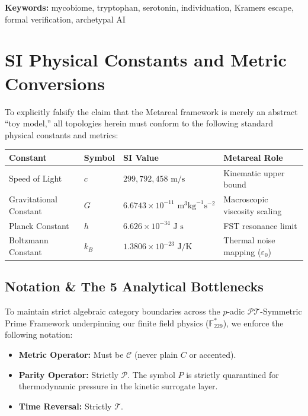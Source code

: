 \medskip\noindent
\textbf{Keywords:} mycobiome, tryptophan, serotonin, individuation,
Kramers escape, formal verification, archetypal AI
\vspace{1em}

\section*{SI Physical Constants and Metric Conversions}
To explicitly falsify the claim that the Metareal framework is merely an abstract ``toy model,'' all topologies herein must conform to the following standard physical constants and metrics:
\begin{table}[ht]
\centering
\renewcommand{\arraystretch}{1.2}
\begin{tabular}{@{}llll@{}}
\toprule
\textbf{Constant} & \textbf{Symbol} & \textbf{SI Value} & \textbf{Metareal Role} \\
\midrule
Speed of Light & $c$ & $299,792,458 \text{ m/s}$ & Kinematic upper bound \\
Gravitational Constant & $G$ & $6.6743 \times 10^{-11} \text{ m}^3 \text{kg}^{-1} \text{s}^{-2}$ & Macroscopic viscosity scaling \\
Planck Constant & $h$ & $6.626 \times 10^{-34} \text{ J s}$ & FST resonance limit \\
Boltzmann Constant & $k_B$ & $1.3806 \times 10^{-23} \text{ J/K}$ & Thermal noise mapping ($\varepsilon_0$) \\
\bottomrule
\end{tabular}
\end{table}


\subsection*{Notation \& The 5 Analytical Bottlenecks}
To maintain strict algebraic category boundaries across the $p$-adic $\mathcal{PT}$-Symmetric Prime Framework underpinning our finite field physics ($\mathbb{F}_{229}^*$), we enforce the following notation: 
\begin{itemize}
    \item \textbf{Metric Operator:} Must be $\mathcal{C}$ (never plain $C$ or accented).
    \item \textbf{Parity Operator:} Strictly $\mathcal{P}$. The symbol $P$ is strictly quarantined for thermodynamic pressure in the kinetic surrogate layer. 
    \item \textbf{Time Reversal:} Strictly $\mathcal{T}$.
\end{itemize}

